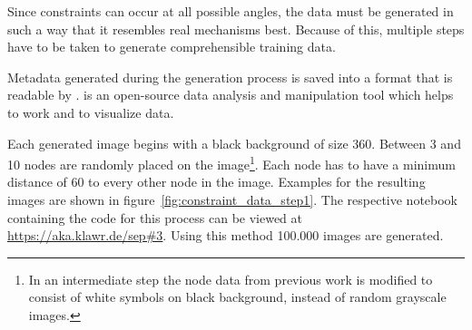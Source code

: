 Since constraints can occur at all possible angles, the data must be generated in such a way that it resembles real mechanisms best.
Because of this, multiple steps have to be taken to generate comprehensible training data.

Metadata generated during the generation process is saved into a format that is readable by . %
 is an open-source data analysis and manipulation tool which helps to work and to visualize data.

Each generated image begins with a black background of size 360.
Between 3 and 10 nodes are randomly placed on the image\footnote{In an intermediate step the node data from previous work is modified to consist of white symbols on black background, instead of random grayscale images.}.
Each node has to have a minimum distance of 60 to every other node in the image.
Examples for the resulting images are shown in figure~\ref{fig:constraint_data_step1}.
The respective notebook containing the code for this process can be viewed at \url{https://aka.klawr.de/sep\#3}.
Using this method 100.000 images are generated.

